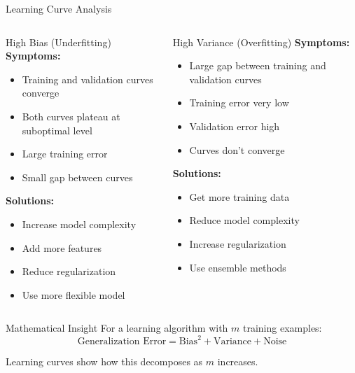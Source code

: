 \documentclass[8pt,aspectratio=1610]{beamer}
\begin{document}
\begin{frame}{Learning Curve Analysis}
\begin{columns}[t]
\begin{column}{0.48\textwidth}
\begin{block}{High Bias (Underfitting)}
\textbf{Symptoms:}
\begin{itemize}
\item Training and validation curves converge
\item Both curves plateau at suboptimal level
\item Large training error
\item Small gap between curves
\end{itemize}

\textbf{Solutions:}
\begin{itemize}
\item Increase model complexity
\item Add more features
\item Reduce regularization
\item Use more flexible model
\end{itemize}
\end{block}
\end{column}

\begin{column}{0.48\textwidth}
\begin{block}{High Variance (Overfitting)}
\textbf{Symptoms:}
\begin{itemize}
\item Large gap between training and validation curves
\item Training error very low
\item Validation error high
\item Curves don't converge
\end{itemize}

\textbf{Solutions:}
\begin{itemize}
\item Get more training data
\item Reduce model complexity
\item Increase regularization
\item Use ensemble methods
\end{itemize}
\end{block}
\end{column}
\end{columns}

\vspace{0.3cm}

\begin{alertblock}{Mathematical Insight}
For a learning algorithm with $m$ training examples:
$$\text{Generalization Error} = \text{Bias}^2 + \text{Variance} + \text{Noise}$$

Learning curves show how this decomposes as $m$ increases.
\end{alertblock}
\end{frame}
\end{document}
